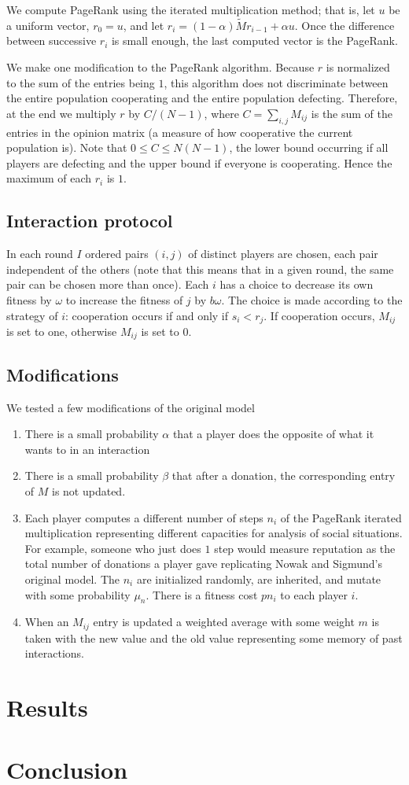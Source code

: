 \documentclass{amsart}
\begin{document}
We compute PageRank using the iterated multiplication method; that is,
let $u$ be a uniform vector, $r_0 = u$, and let $r_i =
(1-\alpha)\tilde M r_{i-1} + \alpha u$. Once the difference between
successive $r_i$ is small enough, the last computed vector is the
PageRank.

We make one modification to the PageRank algorithm. Because $r$ is
normalized to the sum of the entries being $1$, this algorithm does
not discriminate between the entire population cooperating and the
entire population defecting. Therefore, at the end we multiply $r$ by
$C/(N-1)$, where $C = \sum_{i,j} M_{ij}$ is the sum of the entries in
the opinion matrix (a measure of how cooperative the current
population is). Note that $0 \le C \le N(N-1)$, the lower bound
occurring if all players are defecting and the upper bound if everyone
is cooperating. Hence the maximum of each $r_i$ is $1$.

\subsection{Interaction protocol}
In each round $I$ ordered pairs $(i,j)$ of distinct players are
chosen, each pair independent of the others (note that this means that
in a given round, the same pair can be chosen more than once). Each
$i$ has a choice to decrease its own fitness by $\omega$ to increase
the fitness of $j$ by $b \omega$. The choice is made according to the
strategy of $i$: cooperation occurs if and only if $s_i < r_j$. If
cooperation occurs, $M_{ij}$ is set to one, otherwise $M_{ij}$ is set
to $0$.

\subsection{Modifications}
We tested a few modifications of the original model
\begin{enumerate}
\item
There is a small probability $\alpha$ that a player does the opposite
of what it wants to in an interaction
\item
There is a small probability $\beta$ that after a donation, the
corresponding entry of $M$ is not updated.
\item
Each player computes a different number of steps $n_i$ of the PageRank
iterated multiplication representing different capacities for analysis
of social situations. For example, someone who just does $1$ step
would measure reputation as the total number of donations a player
gave replicating Nowak and Sigmund's original model. The $n_i$ are
initialized randomly, are inherited, and mutate with some probability
$\mu_n$. There is a fitness cost $p n_i$ to each player $i$.
\item
When an $M_{ij}$ entry is updated a weighted average with some weight
$m$ is taken with the new value and the old value representing some
memory of past interactions.
\end{enumerate}

\section{Results}
\label{sec:results}

\section{Conclusion}
\label{sec:conclusion}

 
\end{document}
